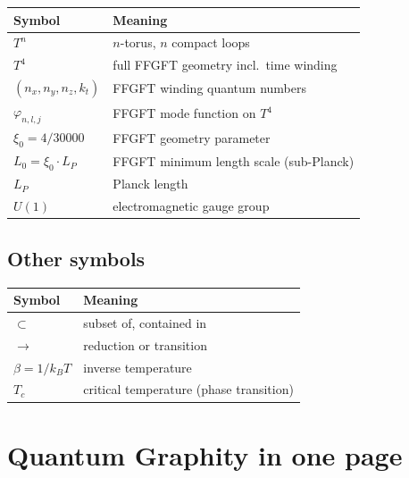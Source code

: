 \begin{center}
\renewcommand{\arraystretch}{1.3}
{\small
\begin{tabular}{>{\raggedright\arraybackslash}p{3.6cm}>{\raggedright\arraybackslash}p{7.4cm}}
\toprule
\textbf{Symbol} & \textbf{Meaning} \\
\midrule
$T^n$ & $n$-torus, $n$ compact loops \\
$T^4$ & full FFGFT geometry incl.\ time winding \\
$(n_x, n_y, n_z, k_t)$ & FFGFT winding quantum numbers \\
$\varphi_{n,l,j}$ & FFGFT mode function on $T^4$ \\
$\xi_0 = 4/30000$ & FFGFT geometry parameter \\
$L_0 = \xi_0 \cdot L_P$ & FFGFT minimum length scale (sub-Planck) \\
$L_P$ & Planck length \\
$U(1)$ & electromagnetic gauge group \\
\bottomrule
\end{tabular}
}
\renewcommand{\arraystretch}{1.0}
\end{center}

\subsection*{Other symbols}

\begin{center}
\renewcommand{\arraystretch}{1.3}
{\small
\begin{tabular}{>{\raggedright\arraybackslash}p{3.6cm}>{\raggedright\arraybackslash}p{7.4cm}}
\toprule
\textbf{Symbol} & \textbf{Meaning} \\
\midrule
$\subset$ & subset of, contained in \\
$\to$ & reduction or transition \\
$\beta = 1/k_BT$ & inverse temperature \\
$T_c$ & critical temperature (phase transition) \\
\bottomrule
\end{tabular}
}
\renewcommand{\arraystretch}{1.0}
\end{center}

\section{Quantum Graphity in one page}

